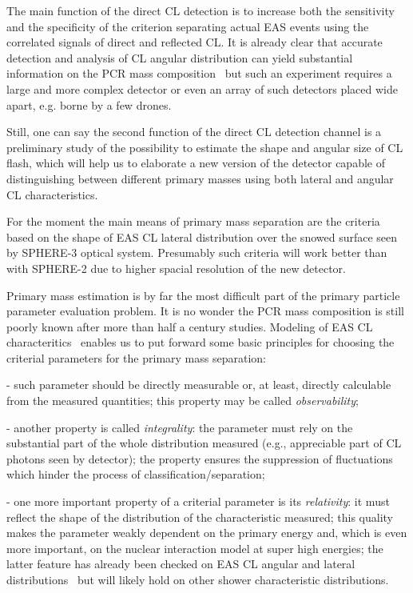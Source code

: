 \documentclass[a4paper,11pt]{article}
\begin{document}
  The main function of the direct CL detection is to increase both the sensitivity and the specificity of the criterion separating actual EAS events using the correlated signals of direct and reflected CL. It is already clear that accurate detection and analysis of CL angular distribution can yield substantial information on the PCR mass composition~\cite{5,6}  but such an experiment requires a large and more complex detector or even an array of such detectors placed wide apart, e.g. borne by a few drones.

  Still, one can say the second function of the direct CL detection channel is a preliminary study of the possibility to estimate the shape and angular size of CL flash, which will help us to elaborate a new version of the detector capable of distinguishing between different primary masses using both lateral and angular CL characteristics.

  For the moment the main means of primary mass separation are the criteria based on the shape of EAS CL lateral distribution over the snowed surface seen by SPHERE-3 optical system. Presumably such criteria will work better than with SPHERE-2 due to higher spacial resolution of the new detector.

Primary mass estimation is by far the most difficult part of the primary particle parameter evaluation problem. It is no wonder the PCR mass composition is still poorly known after more than half a century studies. Modeling of EAS CL characteritics~\cite{5,6,7,8}
enables us to put forward some basic principles for choosing the criterial parameters for the primary mass separation:

- such parameter should be directly measurable or, at least, directly calculable from the measured quantities; this property may be called {\it observability};

- another property is called {\it integrality}: the parameter must rely on the substantial part of the whole distribution measured (e.g., appreciable part of CL photons seen by detector); the property ensures the suppression of fluctuations which hinder the process of classification/separation;

- one more important property of a criterial parameter is its {\it relativity}: it must reflect the shape of the distribution of the characteristic measured; this quality makes the parameter weakly dependent on the primary energy and, which is even more important, on the nuclear interaction model at super high energies; the latter feature has already been checked on EAS CL angular and lateral distributions~\cite{5,6,7,8} but will likely hold on other shower characteristic distributions.
\end{document}
